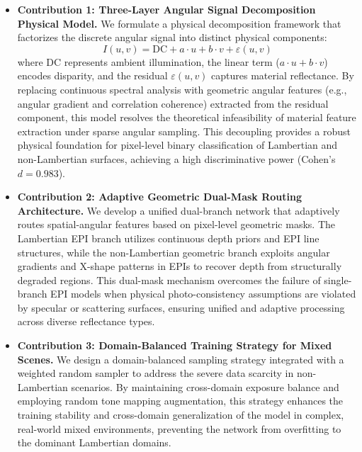 \documentclass[lettersize,journal]{IEEEtran}
\begin{document}
\begin{itemize}
\item \textbf{Contribution 1: Three-Layer Angular Signal Decomposition Physical Model.} We formulate a physical decomposition framework that factorizes the discrete angular signal into distinct physical components:
\begin{equation}
I(u,v) = \text{DC} + a \cdot u + b \cdot v + \varepsilon(u,v)
\end{equation}
where DC represents ambient illumination, the linear term ($a \cdot u + b \cdot v$) encodes disparity, and the residual $\varepsilon(u,v)$ captures material reflectance. By replacing continuous spectral analysis with geometric angular features (e.g., angular gradient and correlation coherence) extracted from the residual component, this model resolves the theoretical infeasibility of material feature extraction under sparse angular sampling. This decoupling provides a robust physical foundation for pixel-level binary classification of Lambertian and non-Lambertian surfaces, achieving a high discriminative power (Cohen's $d = 0.983$).

\item \textbf{Contribution 2: Adaptive Geometric Dual-Mask Routing Architecture.} We develop a unified dual-branch network that adaptively routes spatial-angular features based on pixel-level geometric masks. The Lambertian EPI branch utilizes continuous depth priors and EPI line structures, while the non-Lambertian geometric branch exploits angular gradients and X-shape patterns in EPIs to recover depth from structurally degraded regions. This dual-mask mechanism overcomes the failure of single-branch EPI models when physical photo-consistency assumptions are violated by specular or scattering surfaces, ensuring unified and adaptive processing across diverse reflectance types.

\item \textbf{Contribution 3: Domain-Balanced Training Strategy for Mixed Scenes.} We design a domain-balanced sampling strategy integrated with a weighted random sampler to address the severe data scarcity in non-Lambertian scenarios. By maintaining cross-domain exposure balance and employing random tone mapping augmentation, this strategy enhances the training stability and cross-domain generalization of the model in complex, real-world mixed environments, preventing the network from overfitting to the dominant Lambertian domains.
\end{itemize}
\end{document}
